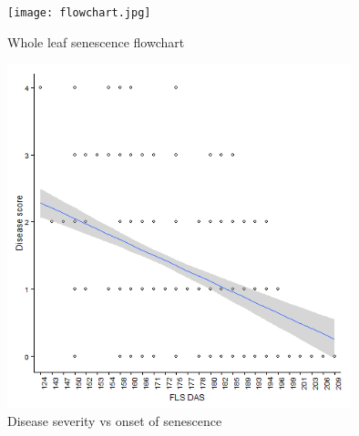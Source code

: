 \documentclass{frontiersSCNS} %
\begin{document}
\begin{figure}[h!]
\begin{center}
\texttt{[image: flowchart.jpg]}
\end{center}
 \caption{ Whole leaf senescence flowchart}\label{fig1:flowchart}
\end{figure}

\begin{figure}[h!]
\begin{center}
\includegraphics[width=10cm]{s_d.png}
\end{center}
 \caption{Disease severity vs onset of senescence}\label{fig2}
\end{figure}
\end{document}
